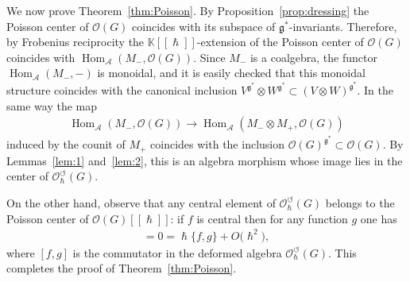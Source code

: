\documentclass[11pt]{article}
\numberwithin{equation}{section}
\newcommand{\ca}{\circlearrowleft}
\newcommand{\mf}[1]{\mathfrak{#1}}
\newcommand{\h}{\hslash}
\newcommand{\ot}{\otimes}
\newcommand{\cO}{\mathcal O}
\newcommand{\cA}{\mathcal {A}}
\newcommand{\kk}{\mathbb K}
\renewcommand{\hom}{\operatorname{Hom}}
\theoremstyle{definition}
\begin{document}
We now prove Theorem~\ref{thm:Poisson}. By Proposition~\ref{prop:dressing} the Poisson center of $\cO(G)$ coincides with its subspace of $\mf g^*$-invariants. Therefore, by Frobenius reciprocity the $\kk[[\h]]$-extension of the Poisson center of $\cO(G)$ coincides with $\hom_\cA(M_-,\cO(G))$. Since $M_-$ is a coalgebra, the functor $\hom_\cA(M_-,-)$ is monoidal, and it is easily checked that this monoidal structure coincides with the canonical inclusion $V^{\mf g^*}\ot W^{\mf g^*}\subset (V\ot W)^{\mf g^*}$. In the same way the map
\begin{gather*}
	\hom_\cA(M_-,\cO(G))\rightarrow \hom_\cA(M_- \ot M_+,\cO(G))
\end{gather*}
induced by the counit of $M_+$ coincides with the inclusion $\cO(G)^{\mf g^*} \subset \cO(G)$. By Lemmas~\ref{lem:1} and~\ref{lem:2}, this is an algebra morphism whose image lies in the center of $\cO_\h^\ca(G)$.

	On the other hand, observe that any central element of $\cO_\h^\ca(G)$ belongs to the Poisson center of $\cO(G)[[\h]]$: if $f$ is central then for any function $g$ one has
	\begin{gather*}
		[f,g]=0=\h\{f,g\}+O\big(\h^2\big),
	\end{gather*}
	where $[f,g]$ is the commutator in the deformed algebra $\cO_\h^\ca(G)$. This completes the proof of Theorem~\ref{thm:Poisson}.
\end{document}
